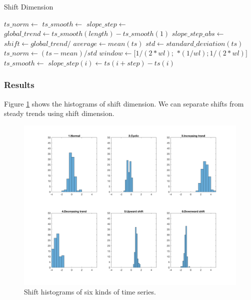 \documentclass[a4paper]{article}
\begin{document}
\begin{algorithm}
\caption{Shift Dimension} \label{alg:shift}
\begin{algorithmic}[1] 

	\State $ts\_norm \gets$ 
	\State $ts\_smooth \gets$ 
	\State $slope\_step \gets$ 
	\State $global\_trend \gets ts\_smooth(length) - ts\_smooth(1)$
	\State $slope\_step\_abs \gets$ 
	\State $shift \gets global\_trend /$ 
	\State
		\State $average \gets mean(ts)$
		\State $std \gets standard\_deviation(ts)$
		\State $ts\_norm \gets (ts - mean) / std$
		\State {}
	\EndFunction
	\State
		\State $window \gets [1/(2*wl);$ $*(1/wl); 1/(2*wl)]$
		\State $ts\_smooth \gets$ 
		\State {}
	\EndFunction
	\State
			\State $slope\_step(i) \gets ts(i+step) - ts(i)$
		\EndFor
		\State {}
	\EndFunction
	
\end{algorithmic}
\end{algorithm}

\subsubsection{Results}
Figure \ref{fig:shift} shows the histograms of shift dimension. We can separate shifts from steady trends using shift dimension.

\begin{figure}[htbp]
\centering
\includegraphics[width=1\textwidth]{shift.png}
\caption{\label{fig:shift}Shift histograms of six kinds of time series.}
\end{figure}
\end{document}
